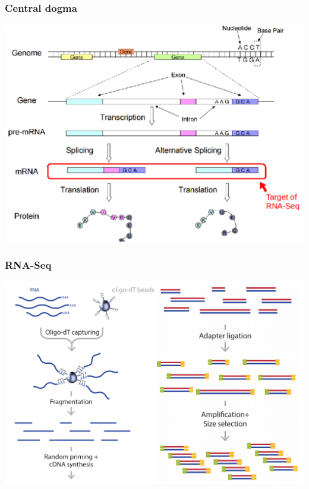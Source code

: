 \documentclass{beamer}			  %
\begin{document}
\begin{frame}
	\frametitle{Central dogma}
	\begin{center}
		\includegraphics[height=0.8\textheight]{figures/dge_00bp.png}
	\end{center}
\end{frame}

\begin{frame}
	\frametitle{RNA-Seq}
	\begin{center}
		\includegraphics[height=0.8\textheight]{figures/dge_01ap.png}
	\end{center}
\end{frame}
\end{document}
